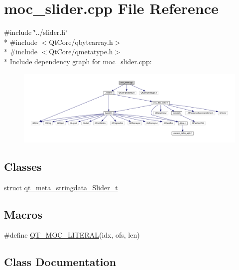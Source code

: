 \hypertarget{a00019}{\section{moc\+\_\+slider.\+cpp File Reference}
\label{a00019}
}
{\ttfamily \#include \char`\"{}../slider.\+h\char`\"{}}\\*
{\ttfamily \#include $<$Qt\+Core/qbytearray.\+h$>$}\\*
{\ttfamily \#include $<$Qt\+Core/qmetatype.\+h$>$}\\*
Include dependency graph for moc\+\_\+slider.\+cpp\+:
\nopagebreak
\begin{figure}[H]
\begin{center}
\leavevmode
\includegraphics[width=350pt]{dd/da2/a00192}
\end{center}
\end{figure}
\subsection*{Classes}
\begin{DoxyCompactItemize}
\item 
struct \hyperlink{a00019_d8/dfa/a00121}{qt\+\_\+meta\+\_\+stringdata\+\_\+\+Slider\+\_\+t}
\end{DoxyCompactItemize}
\subsection*{Macros}
\begin{DoxyCompactItemize}
\item 
\#define \hyperlink{a00019_a75bb9482d242cde0a06c9dbdc6b83abe}{Q\+T\+\_\+\+M\+O\+C\+\_\+\+L\+I\+T\+E\+R\+A\+L}(idx, ofs, len)
\end{DoxyCompactItemize}


\subsection{Class Documentation}
\label{d8/dfa/a00121}
\hypertarget{a00019_d8/dfa/a00121}{}
